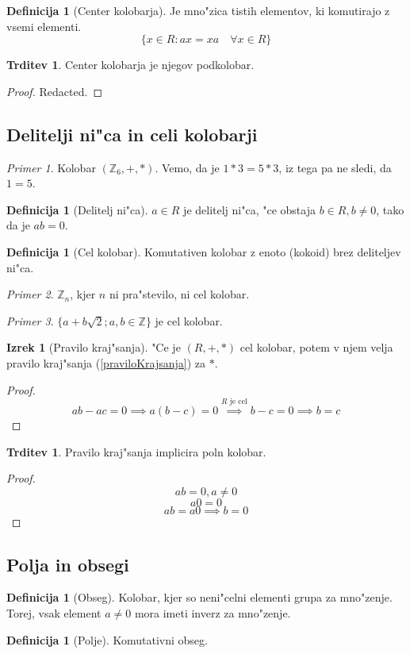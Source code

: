 \documentclass[11pt, a4paper]{article}
\theoremstyle{definition}
\newtheorem{defn}[counter]{Definicija}
\newtheorem{claim}[counter]{Trditev}
\newtheorem{theorem}[counter]{Izrek}
\theoremstyle{remark}
\newtheorem*{ex}{Primer}
\newcommand{\Z}{\mathbb{Z}}
\begin{document}
	\begin{defn}[Center kolobarja]
		Je mno"zica tistih elementov, ki komutirajo z vsemi elementi.
		\[ \lbrace x \in R: ax = xa \quad \forall x \in R \rbrace \]
	\end{defn}
	\begin{claim}
		Center kolobarja je njegov podkolobar.
	\end{claim}
	\begin{proof}
		Redacted.
	\end{proof}

	\subsection{Delitelji ni"ca in celi kolobarji}
	\begin{ex}
		Kolobar $(\Z_6, +, *)$. Vemo, da je $1 * 3 = 5 * 3$, iz tega pa ne sledi, da $1 = 5$.
	\end{ex}
	\begin{defn}[Delitelj ni"ca]
		$a \in R$ je delitelj ni"ca, "ce obstaja $b \in R, b \neq 0$, tako da je $ab = 0$.
	\end{defn}
	\begin{defn}[Cel kolobar]
		Komutativen kolobar z enoto (kokoid) brez deliteljev ni"ca.
	\end{defn}
	\begin{ex}
		$\Z_n$, kjer $n$ ni pra"stevilo, ni cel kolobar.
	\end{ex}
	\begin{ex}
		$ \lbrace a + b \sqrt{2}; a,b\in \Z \rbrace $ je cel kolobar.
	\end{ex}

	\begin{theorem}[Pravilo kraj"sanja]
		"Ce je $(R, +, *)$ cel kolobar, potem v njem velja pravilo kraj"sanja (\ref{praviloKrajsanja}) za $*$.
	\end{theorem}
	\begin{proof}
		\[ ab - ac = 0 \implies a(b-c) = 0 \overset{R \text{ je cel}}{\implies} b-c = 0 \implies b = c\]
	\end{proof}
	\begin{claim}
		Pravilo kraj"sanja implicira poln kolobar.		
	\end{claim}
	\begin{proof}
		\[ ab=0, a \neq 0 \]
		\[ a0 = 0 \]
		\[ ab = a0 \implies b = 0 \]
	\end{proof}

	\subsection{Polja in obsegi}
	\begin{defn}[Obseg]
		Kolobar, kjer so neni"celni elementi grupa za mno"zenje.
		Torej, vsak element $a \neq 0$ mora imeti inverz za mno"zenje.
	\end{defn}
	\begin{defn}[Polje]
		Komutativni obseg.
	\end{defn}
\end{document}

